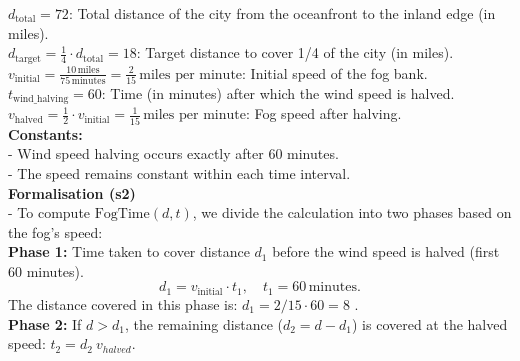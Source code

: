 \documentclass[11pt]{article}
\begin{document}
\begin{table*}[]
\begin{small}
\begin{tcolorbox}[colback=white, colframe=lightblue, rounded corners]
\hspace*{0.5cm} \(d_{\text{total}} = 72\): Total distance of the city from the oceanfront to the inland edge (in miles).\\
\hspace*{0.5cm} \(d_{\text{target}} = \frac{1}{4} \cdot d_{\text{total}} = 18\): Target distance to cover 1/4 of the city (in miles).\\
\hspace*{0.5cm} \(v_{\text{initial}} = \frac{10 \, \text{miles}}{75 \, \text{minutes}} = \frac{2}{15} \, \text{miles per minute}\): Initial speed of the fog bank.\\
\hspace*{0.5cm} \(t_{\text{wind\_halving}} = 60\): Time (in minutes) after which the wind speed is halved.\\
\hspace*{0.5cm} \(v_{\text{halved}} = \frac{1}{2} \cdot v_{\text{initial}} = \frac{1}{15} \, \text{miles per minute}\): Fog speed after halving.\\

\textbf{Constants:}\\

\hspace*{0.5cm} - Wind speed halving occurs exactly after 60 minutes.\\
\hspace*{0.5cm} - The speed remains constant within each time interval.\\


\textbf{Formalisation (s2)}\\

- To compute \( \text{FogTime}(d, t) \), we divide the calculation into two phases based on the fog's speed:\\


\hspace*{0.5cm} \textbf{Phase 1:} Time taken to cover distance \(d_1\) before the wind speed is halved (first 60 minutes). \\
    \[
    d_1 = v_{\text{initial}} \cdot t_1, \quad t_1 = 60 \, \text{minutes}.
    \]
   \hspace*{0.8cm} The distance covered in this phase is:
    $ d_1 = 2/15 \cdot 60 = 8 $ . \\
    
\hspace*{0.5cm} \textbf{Phase 2:} If \(d > d_1\), the remaining distance (\(d_2 = d - d_1\)) is covered at the halved speed:  $ t_2 = d_2 \ v_{halved}$.



\end{tcolorbox}
\end{small}
\end{table*}
\end{document}
